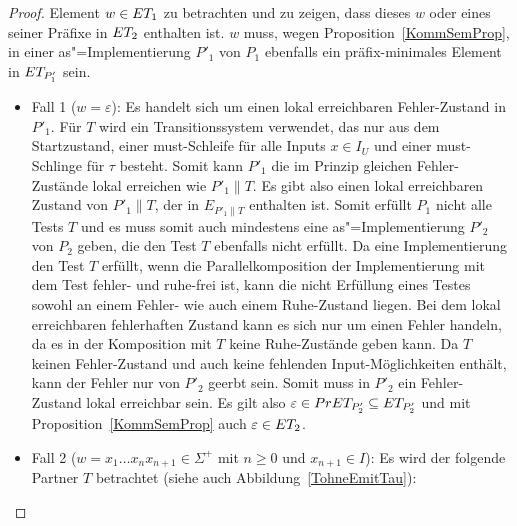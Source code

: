 \begin{proof}
  Element $w\in ET _1$ zu betrachten und zu zeigen, dass dieses $w$ oder eines
  seiner Präfixe in $ET _2$ enthalten ist. $w$ muss, wegen
  Proposition~\ref{KommSemProp}, in einer as"=Implementierung $P'_1$ von $P_1$
  ebenfalls ein präfix-minimales Element in $ET _{P'_1}$ sein.
  \begin{itemize}
    \item Fall 1 ($w=\varepsilon$): Es handelt sich um einen lokal erreichbaren
      Fehler-Zustand in $P'_1$. Für $T$ wird ein Transitionssystem verwendet,
      das nur aus dem Startzustand, einer must-Schleife für alle Inputs $x\in
      I_U$ und einer must-Schlinge für $\tau$ besteht. Somit kann $P'_1$ die im
      Prinzip gleichen Fehler-Zustände lokal erreichen wie $P'_1\|T$. Es gibt
      also einen lokal erreichbaren Zustand von $P'_1\|T$, der in $E_{P'_1\|T}$
      enthalten ist. Somit erfüllt $P_1$ nicht alle Tests $T$ und es muss somit
      auch mindestens eine as"=Implementierung $P'_2$ von $P_2$ geben, die den
      Test $T$ ebenfalls nicht erfüllt. Da eine Implementierung den Test $T$
      erfüllt, wenn die Parallelkomposition der Implementierung mit dem Test
      fehler- und ruhe-frei ist, kann die nicht Erfüllung eines Testes sowohl
      an einem Fehler- wie auch einem Ruhe-Zustand liegen. Bei dem lokal
      erreichbaren \glqq fehlerhaften Zustand\grqq{} kann es sich nur um einen
      Fehler handeln, da es in der Komposition mit $T$ keine Ruhe-Zustände
      geben kann. Da $T$ keinen Fehler-Zustand und auch keine fehlenden
      Input-Möglichkeiten enthält, kann der Fehler nur von $P'_2$ geerbt sein.
      Somit muss in $P'_2$ ein Fehler-Zustand lokal erreichbar sein. Es gilt
      also $\varepsilon \in PrET _{P'_2} \subseteq ET _{P'_2}$ und mit
      Proposition~\ref{KommSemProp} auch $\varepsilon\in ET _2$.
    \item Fall 2 ($w=x_1\dots x_n x_{n+1}\in\Sigma ^+$ mit $n\geq 0$ und
      $x_{n+1}\in I$): Es wird der folgende Partner $T$ betrachtet (siehe auch
      Abbildung~\ref{TohneEmitTau}):
\end{itemize}
\end{proof}
